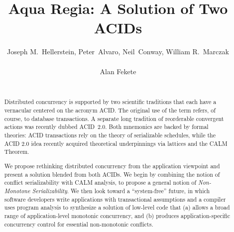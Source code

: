 \documentclass{sig-alternate}
\begin{document}

\title{{\ttlit Aqua Regia}: A Solution of Two ACIDs}
\author{
\alignauthor
Joseph M.~Hellerstein, Peter~Alvaro, Neil~Conway, William R.~Marczak\\
       \\
\alignauthor
Alan Fekete\\
       \\
}

\maketitle
\begin{abstract}
  Distributed concurrency is supported by two scientific traditions that each
  have a vernacular centered on the acronym \textsf{ACID}.  The original use of
  the term refers, of course, to database transactions. A separate long
  tradition of reorderable convergent actions was recently dubbed
  \textsf{ACID~2.0}.  Both mnemonics are backed by formal theories:
  ACID transactions rely on the theory of serializable schedules, while the ACID
  2.0 idea recently acquired theoretical underpinnings via lattices and the CALM
  Theorem.

  We propose rethinking distributed concurrency from the application viewpoint
  and present a solution blended from both ACIDs.  We begin by combining the
  notion of conflict serializability with CALM analysis, to propose a general
  notion of \emph{Non-Monotone Serializability}.  We then look toward a
  ``system-free'' future, in which software developers write applications with
  transactional assumptions and a compiler uses program analysis to synthesize a
  solution of low-level code that (a) allows a broad range of application-level
  monotonic concurrency, and (b) produces application-specific concurrency
  control for essential non-monotonic conflicts.
\end{abstract}
\end{document}
